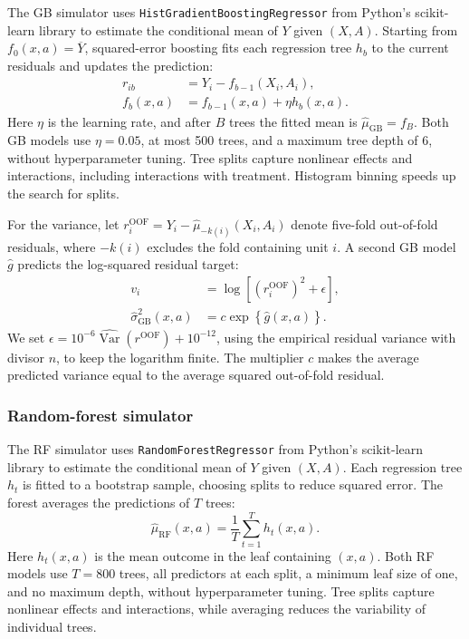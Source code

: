 \begin{landscape}
The GB simulator uses \texttt{HistGradientBoostingRegressor} from Python's scikit-learn library to estimate the conditional mean of \(Y\) given \((X,A)\). Starting from \(f_0(x,a)=\overline Y\), squared-error boosting fits each regression tree \(h_b\) to the current residuals and updates the prediction:
\[
\begin{aligned}
r_{ib} &= Y_i-f_{b-1}(X_i,A_i),\\
f_b(x,a) &= f_{b-1}(x,a)+\eta h_b(x,a).
\end{aligned}
\]
Here \(\eta\) is the learning rate, and after \(B\) trees the fitted mean is \(\widehat\mu_{\mathrm{GB}}=f_B\). Both GB models use \(\eta=0.05\), at most 500 trees, and a maximum tree depth of 6, without hyperparameter tuning. Tree splits capture nonlinear effects and interactions, including interactions with treatment. Histogram binning speeds up the search for splits.

For the variance, let \(r_i^{\mathrm{OOF}}=Y_i-\widehat\mu_{-k(i)}(X_i,A_i)\) denote five-fold out-of-fold residuals, where \(-k(i)\) excludes the fold containing unit \(i\). A second GB model \(\widehat g\) predicts the log-squared residual target:
\[
\begin{aligned}
v_i &= \log\!\left[(r_i^{\mathrm{OOF}})^2+\epsilon\right],\\
\widehat\sigma_{\mathrm{GB}}^2(x,a) &= c\exp\!\left\{\widehat g(x,a)\right\}.
\end{aligned}
\]
We set \(\epsilon=10^{-6}\widehat{\operatorname{Var}}(r^{\mathrm{OOF}})+10^{-12}\), using the empirical residual variance with divisor \(n\), to keep the logarithm finite. The multiplier \(c\) makes the average predicted variance equal to the average squared out-of-fold residual.

\subsubsection{Random-forest simulator}

The RF simulator uses \texttt{RandomForestRegressor} from Python's scikit-learn library to estimate the conditional mean of \(Y\) given \((X,A)\). Each regression tree \(h_t\) is fitted to a bootstrap sample, choosing splits to reduce squared error. The forest averages the predictions of \(T\) trees:
\[
\widehat\mu_{\mathrm{RF}}(x,a)
=\frac{1}{T}\sum_{t=1}^{T}h_t(x,a).
\]
Here \(h_t(x,a)\) is the mean outcome in the leaf containing \((x,a)\). Both RF models use \(T=800\) trees, all predictors at each split, a minimum leaf size of one, and no maximum depth, without hyperparameter tuning. Tree splits capture nonlinear effects and interactions, while averaging reduces the variability of individual trees.


\end{landscape}
